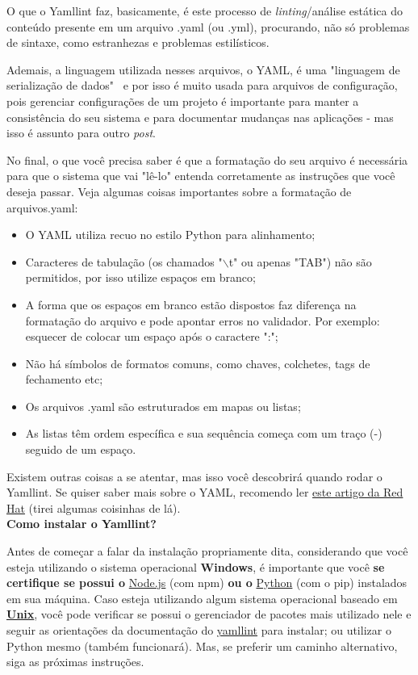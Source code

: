 O que o \gls{Yamllint} faz, basicamente, é este processo de \textit{linting}/análise estática do conteúdo presente em um arquivo .yaml (ou .yml), procurando, não só problemas de sintaxe, como estranhezas e problemas estilísticos. 

Ademais, a linguagem utilizada nesses arquivos, o YAML, é uma "linguagem de serialização de dados" \, e por isso é muito usada para arquivos de configuração, pois gerenciar configurações de um projeto é importante para manter a consistência do seu sistema e para documentar mudanças nas aplicações - mas isso é assunto para outro \textit{post}.

No final, o que você precisa saber é que a formatação do seu arquivo é necessária para que o sistema que vai "lê-lo" entenda corretamente as instruções que você deseja passar. Veja algumas coisas importantes sobre a formatação de arquivos.yaml:

\begin{itemize}
    \item O YAML utiliza recuo no estilo \gls{Python} para alinhamento;
    \item Caracteres de tabulação (os chamados "$\backslash$t" ou apenas "TAB")  não são permitidos, por isso utilize espaços em branco;
    \item A forma que os espaços em branco estão dispostos faz diferença na formatação do arquivo e pode apontar erros no validador. Por exemplo: esquecer de colocar um espaço após o caractere ":";
    \item Não há símbolos de formatos comuns, como chaves, colchetes, tags de fechamento etc;
    \item Os arquivos .yaml são estruturados em mapas ou listas;
    \item As listas têm ordem específica e sua sequência começa com um traço (-) seguido de um espaço.
\end{itemize}

Existem outras coisas a se atentar, mas isso você descobrirá quando rodar o \gls{Yamllint}. Se quiser saber mais sobre o YAML, recomendo ler \href{https://www.redhat.com/pt-br/topics/automation/what-is-yaml}{este artigo da Red Hat} (tirei algumas coisinhas de lá).\\

\textbf{Como instalar o Yamllint?}

Antes de começar a falar da instalação propriamente dita, considerando que você esteja utilizando o sistema operacional \textbf{Windows}, é importante que você \textbf{se certifique se possui o} \href{https://nodejs.org/en/}{Node.js} (com npm) \textbf{ou o} \href{https://python.org.br/instalacao-windows/}{Python} (com o pip) instalados em sua máquina. Caso esteja utilizando algum sistema operacional baseado em \textbf{\href{https://www.tecmundo.com.br/macos/10556-unix-o-pai-de-todos-os-sistemas-operacionais.htm}{Unix}}, você pode verificar se possui o gerenciador de pacotes mais utilizado nele e seguir as orientações da documentação do \href{https://yamllint.readthedocs.io/en/stable/quickstart.html}{yamllint} para instalar; ou utilizar o \gls{Python} mesmo (também funcionará). Mas, se preferir um caminho alternativo, siga as próximas instruções.\\


